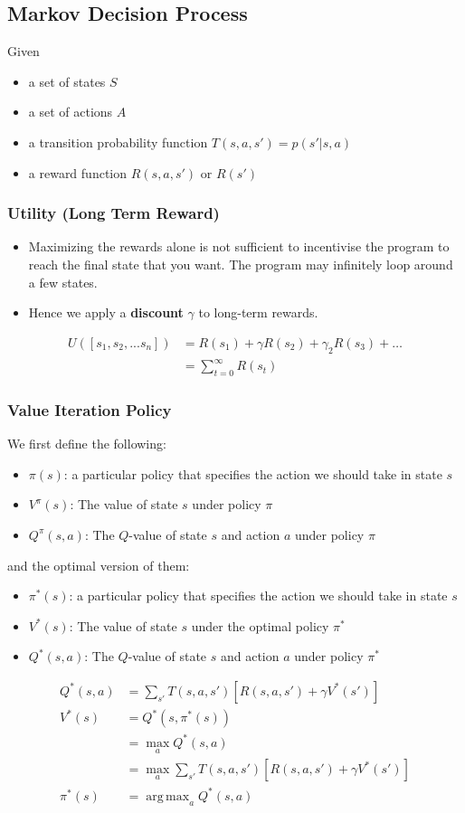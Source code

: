 \documentclass[a4paper]{article}
\DeclareMathOperator*{\argmax}{arg\,max}
\begin{document}
\subsection{Markov Decision Process}
Given
\begin{itemize}
	\item a set of states $S$
	\item a set of actions $A$
	\item a transition probability function $T(s,a,s') = p(s'|s,a) $
	\item a reward function $R(s,a,s')$ or $R(s')$
\end{itemize}

\subsubsection{Utility (Long Term Reward)}
\begin{itemize}
	\item Maximizing the rewards alone is not sufficient to incentivise the program to reach the final state that you want. The program may infinitely loop around a few states.
	\item Hence we apply a \textbf{discount} $\gamma$ to long-term rewards.
\end{itemize}
\begin{align*}
	U([s_1,s_2,...s_n]) &= R(s_1) + \gamma R(s_2) + \gamma_2 R(s_3) + \ldots\\
	&= \sum_{t=0}^\infty R(s_t)
\end{align*}
\newpage
\subsubsection{Value Iteration Policy}
We first define the following:
\begin{itemize}
	\item $\pi(s)$: a particular policy that specifies the action we should take in state $s$
	\item $V^\pi(s)$: The value of state $s$ under policy $\pi$
	\item $Q^\pi(s,a)$: The $Q$-value of state $s$ and action $a$ under policy $\pi$
\end{itemize}
and the optimal version of them:
\begin{itemize}
	\item $\pi^*(s)$: a particular policy that specifies the action we should take in state $s$
	\item $V^*(s)$: The value of state $s$ under the optimal policy $\pi^*$
	\item $Q^*(s,a)$: The $Q$-value of state $s$ and action $a$ under policy $\pi^*$
\end{itemize}
\begin{align*}
	Q^*(s,a) &= \sum_{s'} T(s,a,s') [R(s,a,s') + \gamma V^*(s')]\\
	V^*(s) &= Q^*(s,\pi^*(s))\\
	&= \max_a Q^*(s,a)\\
	&= \max_a \sum_{s'} T(s,a,s') [R(s,a,s') + \gamma V^*(s')]\\
	\pi^*(s) &= \argmax_a Q^*(s,a)
\end{align*}
\end{document}
